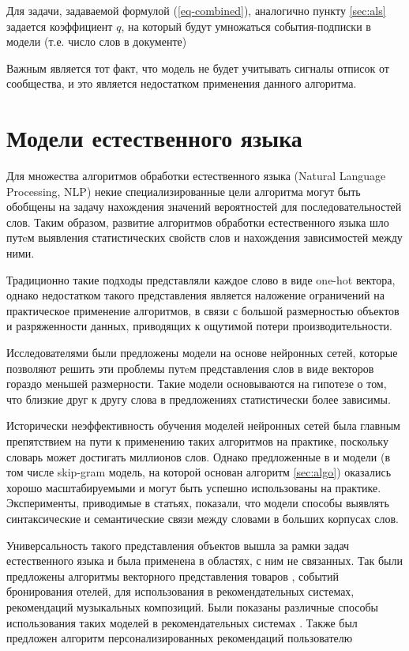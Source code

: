 \documentclass[times,specification,annotation]{itmo-student-thesis}
\begin{document}
Для задачи, задаваемой формулой (\ref{eq-combined}), аналогично пункту \ref{sec:als} задается коэффициент $q$, на который будут умножаться события-подписки в модели (т.е. число слов в документе) 
 
Важным является тот факт, что модель не будет учитывать сигналы отписок от сообщества, и это является недостатком применения данного алгоритма. 

\section{Модели естественного языка}\label{sec:nlp-intro}

Для множества алгоритмов обработки естественного языка (Natural Language Processing, NLP) некие специализированные цели алгоритма могут быть обобщены на задачу нахождения значений вероятностей для последовательностей слов.
Таким образом, развитие алгоритмов обработки естественного языка шло путeм выявления статистических свойств слов и нахождения зависимостей между ними.

Традиционно такие подходы представляли каждое слово в виде one-hot вектора, однако недостатком такого представления является наложение ограничений на практическое применение алгоритмов, в связи с большой размерностью объектов и разряженности данных, приводящих к ощутимой потери производительности.

Исследователями были предложены модели на основе нейронных сетей\cite{turian2010}, которые позволяют решить эти проблемы путeм представления слов в виде векторов гораздо меньшей размерности. Такие модели основываются на гипотезе о том, что близкие друг к другу слова в предложениях статистически более зависимы.

Исторически неэффективность обучения моделей нейронных сетей была главным препятствием на пути к применению таких алгоритмов на практике, поскольку словарь может достигать миллионов слов. Однако предложенные в \cite{mikolov2013efficient} и \cite{mikolov2013distributed} модели (в том числе skip-gram модель, на которой основан алгоритм \ref{sec:algo}) оказались хорошо масштабируемыми и могут быть успешно использованы на практике. Эксперименты, приводимые в статьях, показали, что модели способы выявлять синтаксические и семантические связи между словами в больших корпусах слов. 

Универсальность такого представления объектов вышла за рамки задач естественного языка и была применена в областях, с ним не связанных. Так были предложены алгоритмы векторного представления товаров \cite{grbovic2015commerce}\cite{Vasile2016}, событий бронирования отелей\cite{airbnb}, для использования в рекомендательных системах, рекомендаций музыкальных композиций\cite{cheng2017exploiting}. Были показаны различные способы использования таких моделей в рекомендательных системах \cite{ozsoy2016word}. Также был предложен алгоритм персонализированных рекомендаций пользователю \cite{manotumruksa2016modelling}
\end{document}
